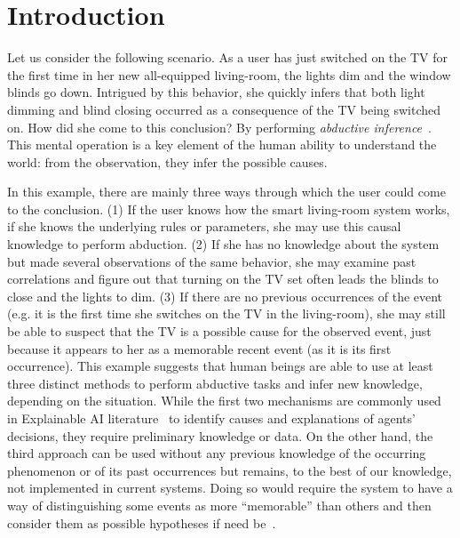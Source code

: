\documentclass[entropy,article,submit,moreauthors,pdftex]{Definitions/mdpi}
\begin{document}

\section{Introduction}
\label{sec:introduction}

Let us consider the following scenario. As a user has just switched on the TV for the first time in her new  all-equipped living-room, the
lights dim and the window blinds go down. Intrigued by this behavior, she
quickly infers that both light dimming and blind closing occurred as a
consequence of the TV being switched on. How did she come to this conclusion?
By performing \emph{abductive inference}~\cite{magnani_abduction_2011}. This mental operation
is a key element of the human ability to understand the world: from the
observation, they infer the possible causes.

In this example, there are mainly three ways through which the user could come to the
conclusion. (1) If the user knows how the smart living-room system works, if she
knows the underlying rules or parameters, she may use this causal
knowledge to perform abduction. (2) If she has no knowledge
about the system but made several observations of the same behavior, she may examine past
correlations and figure out that turning on the TV set often leads the blinds to
close and the lights to dim. (3) If there are no previous occurrences of the event (e.g. it is the first time she switches on the TV
in the living-room), she may still be able to
suspect that the TV is a possible cause for the observed event, just because it appears to her as a memorable recent event (as it is its first occurrence). This example
suggests that human beings are able to use at least three distinct methods to perform abductive tasks
and infer new knowledge, depending on the situation. While the first two mechanisms are commonly used in Explainable AI literature~\cite{arrieta_explainable_2020} to identify causes and explanations of agents' decisions, they require preliminary knowledge or data. On the other hand,  the third approach can be used without any previous knowledge of the occurring phenomenon or of its past occurrences but remains, to the best of our knowledge, not implemented in current systems. Doing so would require the system to have a way of distinguishing some events as more ``memorable'' than others and then consider them as possible hypotheses if need be~\cite{magnani_abduction_2011}.
\end{document}
